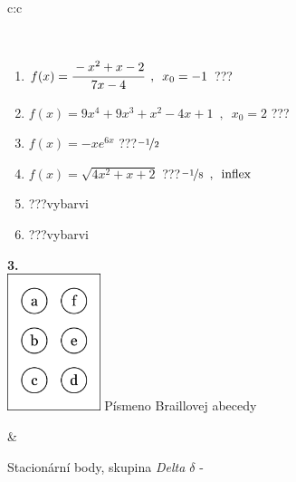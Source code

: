 \documentclass[10pt]{report}
\begin{document}
\begin{tabular}{c:c}
\begin{minipage}[c][104.5mm][t]{0.5\linewidth}
\begin{center}
\begin{minipage}{0.95\linewidth}
\begin{center}
\end{center}
\end{minipage}
\\[1mm]
\begin{minipage}{0.79\linewidth}
\begin{center}
\begin{varwidth}{\linewidth}
\begin{enumerate}
\normalsize
\item $f(x)=\cfrac{-x^2+x-2}{7x-4}\enspace , \enspace x_0=-1$\quad \dotfill\; ???\;\dotfill \quad {}
\item $f(x)=9x^4+9x^3+x^2-4x+1\enspace , \enspace x_0=2$\quad \dotfill\; ???\;\dotfill \quad {}
\item $f(x)=-xe^{6x}$\quad \dotfill\; ???\;\dotfill \quad $\nicefrac{-1}{2}$
\item $f(x)=\sqrt{4x^2+x+2}$\quad \dotfill\; ???\;\dotfill \quad $\nicefrac{-1}{8}\enspace , \enspace\mathrm{inflex}$
\item \quad \dotfill\; ???\;\dotfill \quad vybarvi
\item \quad \dotfill\; ???\;\dotfill \quad vybarvi
\end{enumerate}
\end{varwidth}
\end{center}
\end{minipage}
\begin{minipage}{0.20\linewidth}
\begin{center}
{\Huge\bfseries 3.} \\[2mm]
\includegraphics[height=40mm]{../images/braille.png}
{\small Písmeno Braillovej abecedy}
\end{center}
\end{minipage}
\end{center}
\end{minipage}
&
\begin{minipage}[c][104.5mm][t]{0.5\linewidth}
\begin{center}
\vspace{7mm}
{\huge Stacionární body, skupina \textit{Delta $\delta$} -}\\[5mm]

\end{center}
\end{minipage}
\end{tabular}
\end{document}
